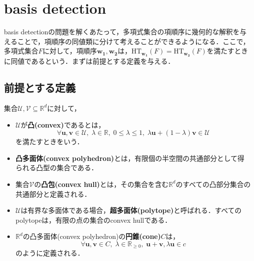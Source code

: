 \section{\groebner{} basis detection\cite{gritzmann1993minkowski}}
\groebner{} basis detectionの問題を解くあたって，多項式集合の項順序に幾何的な解釈を与えることで，項順序の同値類に分けて考えることができるようになる．ここで，多項式集合$F$に対して，項順序$\bm{w_1}, \bm{w_2}$は，$\mathrm{HT}_{\bm{w_1}}(F) = \mathrm{HT}_{\bm{w_2}}(F)$を満たすときに同値であるという．まずは前提とする定義を与える．
\subsection{前提とする定義}

\begin{definition}
	集合$\mathcal{U, V} \subseteq \mathbb{R}^d$に対して，
	\begin{itemize}
		\item $\mathcal{U}$が\textbf{凸(convex)}であるとは，$$\forall \bm{u, v} \in \mathcal{U}, \; \lambda \in \mathbb{R}, \; 0 \le \lambda \le 1, \; \lambda\bm{u} + (1 - \lambda) \bm{v} \in \mathcal{U}$$を満たすときをいう．
		\item \textbf{凸多面体(convex polyhedron)}とは，有限個の半空間の共通部分として得られる凸型の集合である．
		\item 集合$\mathcal{V}$の\textbf{凸包(convex hull)}とは，その集合を含む$\mathbb{R}^d$のすべての凸部分集合の共通部分と定義される．
		\item  $\mathcal{U}$は有界な多面体である場合，\textbf{超多面体(polytope)}と呼ばれる．すべてのpolytopeは，有限の点の集合のconvex hullである．
		\item $\mathbb{R}^d$の凸多面体(convex polyhedron)の\textbf{円錐(cone)}$C$は，$$\forall \bm{u, v} \in C, \; \lambda \in \mathbb{R}_{\ge 0}, \; \bm{u+v}, \lambda\bm{u} \in c$$のように定義される．
	\end{itemize}
\end{definition}
